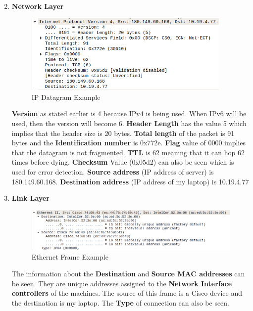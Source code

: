 \documentclass[a4paper,10pt]{article}
\newlength{\strutheight}
\begin{document}
\begin{enumerate}
\begin{adjustbox}{valign=T,raise=\strutheight,minipage={\linewidth}}
	\end{adjustbox} 
	\pagebreak
	\item \textbf{\color{Magenta} \large Network Layer }\\
	\begin{adjustbox}{valign=T,raise=\strutheight,minipage={\linewidth}}
		\begin{figure}
			\includegraphics[width=10cm]{Images/IpEx}
			\caption{IP Datagram Example}
		\end{figure}
		\strut{}
		\textbf{Version} as stated earlier is 4 because IPv4 is being used. When IPv6 will be used, then the version will become 6. \textbf{Header Length} has the value 5 which implies that the header size is 20 bytes. \textbf{Total length} of the packet is 91 bytes and the \textbf{Identification number} is 0x772e. \textbf{Flag} value of 0000 implies that the datagram is not fragmented. \textbf{TTL} is 62 meaning that it can hop 62 times before dying. \textbf{Checksum} Value (0x05d2) can also be seen which is used for error detection. \textbf{Source address} (IP address of server) is 180.149.60.168. \textbf{Destination address} (IP address of my laptop) is 10.19.4.77
	\end{adjustbox} 
	\item \textbf{\color{Magenta} \large Link Layer }\\
	\begin{adjustbox}{valign=T,raise=\strutheight,minipage={\linewidth}}
		\begin{figure}
			\includegraphics[width=12cm]{Images/linkEx}
			\caption{Ethernet Frame Example}
		\end{figure}
		\strut{}
		The information about the \textbf{Destination} and \textbf{Source MAC addresses} can be seen. They are unique addresses assigned to the \textbf{Network Interface controllers} of the machines. The source of this frame is a Cisco device and the destination is my laptop. The \textbf{Type} of connection can also be seen.
	\end{adjustbox} 
\end{enumerate}
\end{document}
